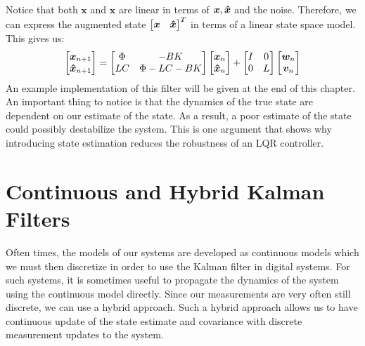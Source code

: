 Notice that both $\bm{x}$ and $\bm{\hat{x}}$ are linear in terms of $\bm{x},\bm{\hat{x}}$ and the noise. Therefore, we can express the augmented state $\begin{bmatrix}
    \bm{x}&\bm{\hat{x}}
\end{bmatrix}^T$ in terms of a linear state space model. This gives us:
$$\begin{bmatrix}
    {\bm{x}_{n+1}}\\
    {\bm{\hat{x}}}_{n+1}
\end{bmatrix}=\begin{bmatrix}
    \Phi&-BK\\LC&\Phi-LC-BK\\
\end{bmatrix}\begin{bmatrix}
    {\bm{x}_n}\\
    {\bm{\hat{x}}_n}
\end{bmatrix}+\begin{bmatrix}
    I&0\\0&L
\end{bmatrix}\begin{bmatrix}
\bm{w}_n\\\bm{v}_n
\end{bmatrix}$$
An example implementation of this filter will be given at the end of this chapter. An important thing to notice is that the dynamics of the true state are dependent on our estimate of the state. As a result, a poor estimate of the state could possibly destabilize the system. This is one argument that shows why introducing state estimation reduces the robustness of an LQR controller.


\section{Continuous and Hybrid Kalman Filters}

Often times, the models of our systems are developed as continuous models which we must then discretize in order to use the Kalman filter in digital systems. For such systems, it is sometimes useful to propagate the dynamics of the system using the continuous model directly. Since our measurements are very often still discrete, we can use a hybrid approach. Such a hybrid approach allows us to have continuous update of the state estimate and covariance with discrete measurement updates to the system.

